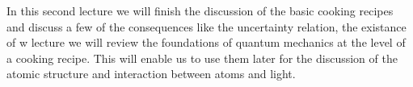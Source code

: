 In this second lecture we will finish the discussion of the basic cooking recipes and discuss a few of the consequences like the uncertainty relation, the existance of w lecture we will review the foundations of quantum mechanics at the level of a cooking recipe. This will enable us to use them later for the discussion of the atomic structure and interaction between atoms and light.